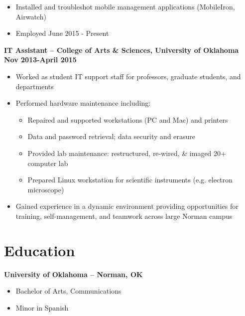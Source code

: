 \documentclass[line]{res}
\begin{document}
\begin{resume}
\begin{itemize}
		\item Installed and troubleshot mobile management applications (MobileIron, Airwatch)
		\item{Employed June 2015 - Present}
	\end{itemize}
\textbf{IT Assistant -- College of Arts \& Sciences, University of Oklahoma}
\newline
\textbf{Nov 2013-April 2015}
\begin{itemize}
	\item Worked as student IT support staff for professors, graduate students, and departments
	\item Performed hardware maintenance including:
		\begin{itemize}
			\item Repaired and supported workstations (PC and Mac) and printers
			\item Data and password retrieval; data security and erasure
			\item Provided lab maintenance: restructured, re-wired, \& imaged 20+ computer lab 
			\item Prepared Linux workstation for scientific instruments (e.g. electron microscope)
		\end{itemize}
	\item Gained experience in a dynamic environment providing opportunities for training, self-management, and teamwork across large Norman campus
\end{itemize}

\section{Education}
\textbf{University of Oklahoma -- Norman, OK}
\begin{itemize}
\item Bachelor of Arts, Communications
\item Minor in Spanish
	\end{itemize}



\end{resume}
\end{document}

